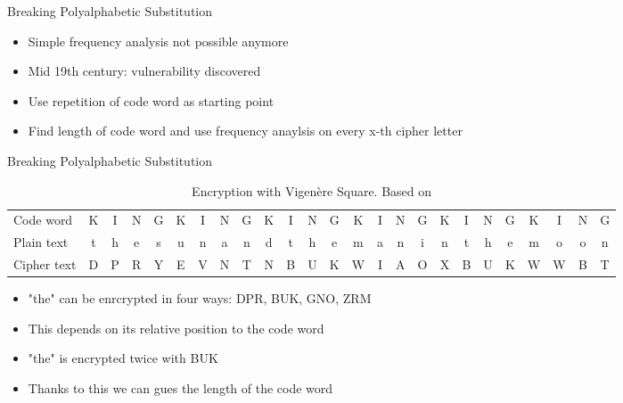 \documentclass[]{beamer}
\begin{document}
\begin{frame}{Breaking Polyalphabetic Substitution}
	\begin{itemize}
		\item<1-> Simple frequency analysis not possible anymore
		\item<2-> Mid 19th century: vulnerability discovered
		\item<3-> Use repetition of code word as starting point
		\item<4-> Find length of code word and use frequency anaylsis on every x-th cipher letter
	\end{itemize}
\end{frame}

\begin{frame}{Breaking Polyalphabetic Substitution}
	\begin{table}
		\centering
		\resizebox{10.5cm}{!} {
			\begin{tabular}{l c c c c c c c c c c c c c c c c c c c c c c c c}
				\hline
				Code word &K&I&N&G&K&I&N&G&K&I&N&G&K&I&N&G&K&I&N&G&K&I&N&G\\
				Plain text &t&h&e&s&u&n&a&n&d&t&h&e&m&a&n&i&n&t&h&e&m&o&o&n \\
				Cipher text &D&P&R&Y&E&V&N&T&N&B&U&K&W&I&A&O&X&B&U&K&W&W&B&T\\
				\hline
			\end{tabular}
		}
		\caption{Encryption with Vigenère Square. Based on \cite{singh1999}}
	\end{table}
	\begin{itemize}
		\item<2-> "the" can be enrcrypted in four ways: DPR, BUK, GNO, ZRM
		\item<4-> This depends on its relative position to the code word
		\item<5-> "the" is encrypted twice with BUK
		\item<6-> Thanks to this we can gues the length of the code word
	\end{itemize}
\end{frame}
\end{document}
